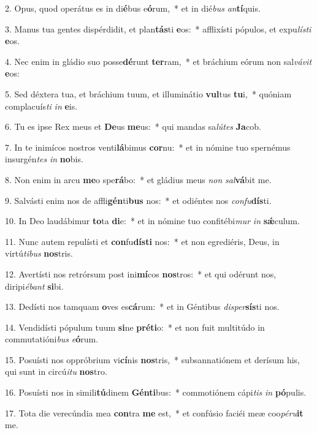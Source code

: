 2. Opus, quod operátus es in di\textbf{é}bus e\textbf{ó}rum,~*  et in dié\textit{bus} \textit{an}\textbf{tí}quis.\

3. Manus tua gentes dispérdidit, et plan\textbf{tás}ti \textbf{e}os:~*  afflixísti pópulos, et expu\textit{lís}\textit{ti} \textbf{e}os.\

4. Nec enim in gládio suo posse\textbf{dé}runt \textbf{ter}ram,~*  et bráchium eórum non sal\textit{vá}\textit{vit} \textbf{e}os:\

5. Sed déxtera tua, et bráchium tuum, et illuminátio \textbf{vul}tus \textbf{tu}i,~*  quóniam complacuís\textit{ti} \textit{in} \textbf{e}is.\

6. Tu es ipse Rex meus et \textbf{De}us \textbf{me}us:~*  qui mandas sa\textit{lú}\textit{tes} \textbf{Ja}cob.\

7. In te inimícos nostros venti\textbf{lá}bimus \textbf{cor}nu:~*  et in nómine tuo spernémus insurgén\textit{tes} \textit{in} \textbf{no}bis.\

8. Non enim in arcu \textbf{me}o spe\textbf{rá}bo:~*  et gládius meus \textit{non} \textit{sal}\textbf{vá}bit me.\

9. Salvásti enim nos de affli\textbf{gén}ti\textbf{bus} nos:~*  et odiéntes nos \textit{con}\textit{fu}\textbf{dís}ti.\

10. In Deo laudábimur \textbf{to}ta \textbf{di}e:~*  et in nómine tuo confitébi\textit{mur} \textit{in} \textbf{sǽ}culum.\

11. Nunc autem repulísti et \textbf{con}fu\textbf{dís}\textbf{ti} nos:~*  et non egrediéris, Deus, in virtú\textit{ti}\textit{bus} \textbf{nos}tris.\

12. Avertísti nos retrórsum post ini\textbf{mí}cos \textbf{nos}tros:~*  et qui odérunt nos, diripi\textit{é}\textit{bant} \textbf{si}bi.\

13. Dedísti nos tamquam \textbf{o}ves es\textbf{cá}rum:~*  et in Géntibus \textit{di}\textit{sper}\textbf{sís}ti nos.\

14. Vendidísti pópulum tuum \textbf{si}ne \textbf{pré}\textbf{ti}o:~*  et non fuit multitúdo in commutatióni\textit{bus} \textit{e}\textbf{ó}rum.\

15. Posuísti nos oppróbrium vi\textbf{cí}nis \textbf{nos}tris,~*  subsannatiónem et derísum his, qui sunt in circú\textit{i}\textit{tu} \textbf{nos}tro.\

16. Posuísti nos in simili\textbf{tú}dinem \textbf{Gén}\textbf{ti}bus:~*  commotiónem cápi\textit{tis} \textit{in} \textbf{pó}pulis.\

17. Tota die verecúndia mea \textbf{con}tra \textbf{me} est,~*  et confúsio faciéi meæ coo\textit{pé}\textit{ru}\textbf{it} me.\


